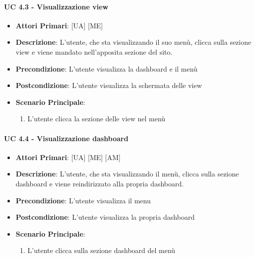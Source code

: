 			\paragraph{UC 4.3 - Visualizzazione view}
			\begin{itemize}
				\item \textbf{Attori Primari}: [UA] [ME]
				\item \textbf{Descrizione}: L'utente, che sta visualizzando il suo menù, clicca sulla sezione view e viene mandato nell'apposita sezione del sito.
				\item \textbf{Precondizione}: L'utente visualizza la dashboard e il menù
				\item \textbf{Postcondizione}: L'utente visualizza la schermata delle view
				\item \textbf{Scenario Principale}:
				\begin{enumerate}
					\item{L'utente clicca la sezione delle view nel menù}
					
				\end{enumerate}	
			\end{itemize}

			\paragraph{UC 4.4 - Visualizzazione dashboard}
			\begin{itemize}
				\item \textbf{Attori Primari}: [UA] [ME] [AM]
				\item \textbf{Descrizione}: L'utente, che sta visualizzando il menù, clicca sulla sezione dashboard e viene reindirizzato alla propria dashboard.
				\item \textbf{Precondizione}: L'utente visualizza il menu
				\item \textbf{Postcondizione}: L'utente visualizza la propria dashboard
				\item \textbf{Scenario Principale}:
				\begin{enumerate}
					\item{L'utente clicca sulla sezione dashboard del menù}
				\end{enumerate}	
			\end{itemize}

